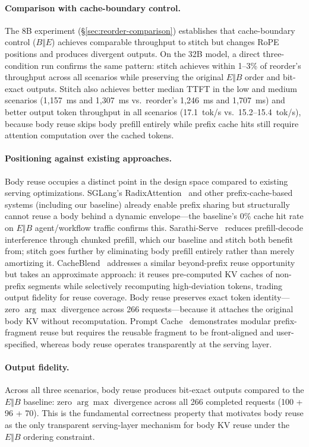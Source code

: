 \documentclass[conference]{IEEEtran}
\begin{document}
\paragraph{Comparison with cache-boundary control.}
The 8B experiment (\S\ref{sec:reorder-comparison}) establishes that cache-boundary control ($B \Vert E$) achieves comparable throughput to stitch but changes RoPE positions and produces divergent outputs. On the 32B model, a direct three-condition run confirms the same pattern: stitch achieves within 1--3\% of reorder's throughput across all scenarios while preserving the original $E \Vert B$ order and bit-exact outputs. Stitch also achieves better median TTFT in the low and medium scenarios (1{,}157~ms and 1{,}307~ms vs.\ reorder's 1{,}246~ms and 1{,}707~ms) and better output token throughput in all scenarios (17.1~tok/s vs.\ 15.2--15.4~tok/s), because body reuse skips body prefill entirely while prefix cache hits still require attention computation over the cached tokens.

\paragraph{Positioning against existing approaches.}
Body reuse occupies a distinct point in the design space compared to existing serving optimizations. SGLang's RadixAttention~\cite{zheng2024sglang} and other prefix-cache-based systems (including our baseline) already enable prefix sharing but structurally cannot reuse a body behind a dynamic envelope---the baseline's 0\% cache hit rate on $E \Vert B$ agent/workflow traffic confirms this. Sarathi-Serve~\cite{agrawal2024sarathi} reduces prefill-decode interference through chunked prefill, which our baseline and stitch both benefit from; stitch goes further by eliminating body prefill entirely rather than merely amortizing it. CacheBlend~\cite{yao2025cacheblend} addresses a similar beyond-prefix reuse opportunity but takes an approximate approach: it reuses pre-computed KV caches of non-prefix segments while selectively recomputing high-deviation tokens, trading output fidelity for reuse coverage. Body reuse preserves exact token identity---zero $\arg\max$ divergence across 266 requests---because it attaches the original body KV without recomputation. Prompt Cache~\cite{gim2024promptcache} demonstrates modular prefix-fragment reuse but requires the reusable fragment to be front-aligned and user-specified, whereas body reuse operates transparently at the serving layer.

\paragraph{Output fidelity.}
Across all three scenarios, body reuse produces bit-exact outputs compared to the $E \Vert B$ baseline: zero $\arg\max$ divergence across all 266 completed requests (100 + 96 + 70). This is the fundamental correctness property that motivates body reuse as the only transparent serving-layer mechanism for body KV reuse under the $E \Vert B$ ordering constraint.
\end{document}
